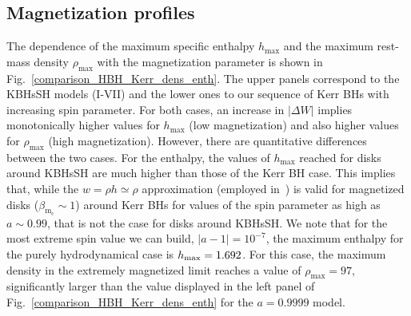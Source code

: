 \documentclass[twocolumn,aps,showpacs,showkeys,prd,superscriptaddress,byrevtex, amsmath]{revtex4-1}
\begin{document}
\subsection{Magnetization profiles}

The dependence of the maximum specific enthalpy $h_{\mathrm{max}}$ and the maximum rest-mass density $\rho_{\mathrm{max}}$ with the magnetization parameter is shown in Fig.~\ref{comparison_HBH_Kerr_dens_enth}. The upper panels correspond to the KBHsSH models (I-VII) and the lower ones to our sequence of Kerr BHs with increasing spin parameter. For both cases, an increase in $|\Delta W|$ implies monotonically  higher values for $h_{\mathrm{max}}$ (low magnetization) and also higher values for $\rho_{\mathrm{max}}$ (high magnetization). However, there are quantitative differences between the two cases. For the enthalpy, the values of $h_{\mathrm{max}}$ reached for disks around KBHsSH are much higher than those of the Kerr BH case. This implies that, while the $w = \rho h \simeq \rho$ approximation (employed in~\cite{Komissarov:2006,Gimeno-Soler:2017}) is valid for magnetized disks ($\beta_{\mathrm{m_c}} \sim 1$) around Kerr BHs for values of the spin parameter as high as $a \sim 0.99$, that is not the case for disks around KBHsSH. We note that for the most extreme spin value we can build, $|a-1|=10^{-7}$, the maximum enthalpy for the purely hydrodynamical case is $h_{\rm max}=1.692$. For this case, the maximum density in the extremely magnetized limit reaches a value of $\rho_{\mathrm{max}} = 97$, significantly larger than the value displayed in the left panel of Fig.~\ref{comparison_HBH_Kerr_dens_enth} for the $a=0.9999$ model.
\end{document}
